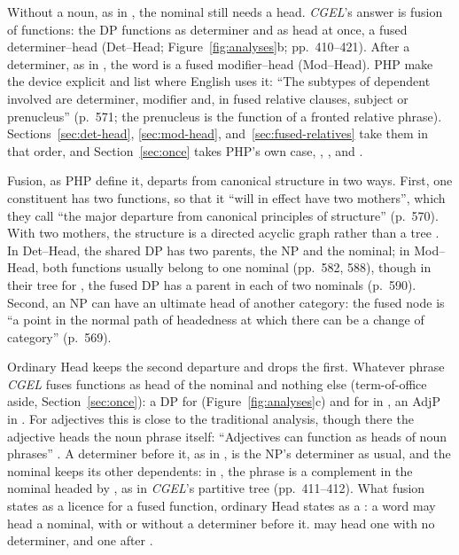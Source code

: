 Without a noun, as in , the nominal still needs a head. \textit{CGEL}'s answer is fusion of functions: the DP functions as determiner and as head at once, a fused determiner--head (Det--Head; Figure~\ref{fig:analyses}b; pp.~410--421). After a determiner, as in , the word is a fused modifier--head (Mod--Head). PHP make the device explicit and list where English uses it: \enquote{The subtypes of dependent involved are determiner, modifier and, in fused relative clauses, subject or prenucleus} (p.~571; the prenucleus is the function of a fronted relative phrase). Sections~\ref{sec:det-head}, \ref{sec:mod-head}, and~\ref{sec:fused-relatives} take them in that order, and Section~\ref{sec:once} takes PHP's own case, , , and .

Fusion, as PHP define it, departs from canonical structure in two ways. First, one constituent has two functions, so that it \enquote{will in effect have two mothers}, which they call \enquote{the major departure from canonical principles of structure} (p.~570). With two mothers, the structure is a directed acyclic graph rather than a tree \citep{pullumRogers2008Expressive}. In Det--Head, the shared DP has two parents, the NP and the nominal; in Mod--Head, both functions usually belong to one nominal (pp.~582, 588), though in their tree for , the fused DP has a parent in each of two nominals (p.~590). Second, an NP can have an ultimate head of another category: the fused node is \enquote{a point in the normal path of headedness at which there can be a change of category} (p.~569).

Ordinary Head keeps the second departure and drops the first. Whatever phrase \textit{CGEL} fuses functions as head of the nominal and nothing else (term-of-office  aside, Section~\ref{sec:once}): a DP for  (Figure~\ref{fig:analyses}c) and for  in , an AdjP in . For adjectives this is close to the traditional analysis, though there the adjective heads the noun phrase itself: \enquote{Adjectives can function as heads of noun phrases} \citep[421]{quirk1985}. A determiner before it, as  in , is the NP's determiner as usual, and the nominal keeps its other dependents: in , the  phrase is a complement in the nominal headed by , as in \textit{CGEL}'s partitive tree (pp.~411--412). What fusion states as a licence for a fused function, ordinary Head states as a : a word may head a nominal, with or without a determiner before it.  may head one with no determiner, and  one after .

